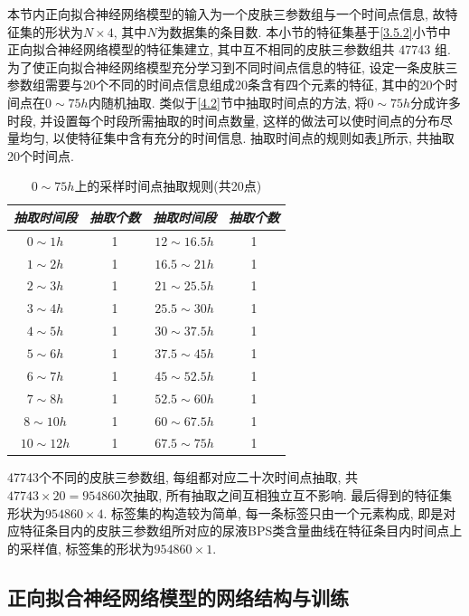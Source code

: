 \documentclass[a4paper,punct=banjiao,twoside]{ctexrep}
\theoremstyle{plain}
\theoremstyle{definition}
\theoremstyle{remark}
\begin{document}
本节内正向拟合神经网络模型的输入为一个皮肤三参数组与一个时间点信息, 故特征集的形状为$N\times 4$, 其中$N$为数据集的条目数.
本小节的特征集基于\ref{3.5.2}小节中正向拟合神经网络模型的特征集建立, 其中互不相同的皮肤三参数组共 47743 组.
为了使正向拟合神经网络模型充分学习到不同时间点信息的特征, 设定一条皮肤三参数组需要与20个不同的时间点信息组成20条含有四个元素的特征, 其中的20个时间点在$0\sim 75h$内随机抽取. 类似于\ref{4.2}节中抽取时间点的方法, 将$0\sim 75h$分成许多时段, 并设置每个时段所需抽取的时间点数量, 这样的做法可以使时间点的分布尽量均匀, 以使特征集中含有充分的时间信息. 抽取时间点的规则如表\ref{tab6}所示, 共抽取20个时间点.
\begin{table}[htbp]
  \centering
  \begin{tabular}[t]{cc|cc}
    \hline
    \textit{抽取时间段} & \textit{抽取个数} &\textit{抽取时间段} & \textit{抽取个数}\\
    \hline
    $0\sim 1h$&  1 &$12\sim 16.5h$&  1 \\ 
    $1\sim 2h$&  1 &$16.5\sim 21h$&  1 \\ 
    $2\sim 3h$&  1 &$21\sim 25.5h$&  1 \\ 
    $3\sim 4h$&  1 & $25.5\sim 30h$&  1 \\  
    $4\sim 5h$&  1 &$30\sim 37.5h$&  1 \\ 
    $5\sim 6h$&  1 &$37.5\sim 45h$&  1 \\  
    $6\sim 7h$&  1 &$45\sim 52.5h$&  1 \\ 
    $7\sim 8h$&  1 &$52.5\sim 60h$&  1 \\ 
    $8\sim 10h$&  1 &$60\sim 67.5h$&  1 \\ 
    $10\sim 12h$&  1 &$67.5\sim 75h$&  1 \\
    \hline
  \end{tabular}
  \caption{\label{tab6}$0\sim75h$上的采样时间点抽取规则(共20点)} 
\end{table}  

47743个不同的皮肤三参数组, 每组都对应二十次时间点抽取, 共$47743\times 20= 954860$次抽取, 所有抽取之间互相独立互不影响.
最后得到的特征集形状为$954860\times 4$. 标签集的构造较为简单, 每一条标签只由一个元素构成, 即是对应特征条目内的皮肤三参数组所对应的尿液BPS类含量曲线在特征条目内时间点上的采样值, 标签集的形状为$954860\times 1$.

\subsection*{正向拟合神经网络模型的网络结构与训练}
\end{document}
